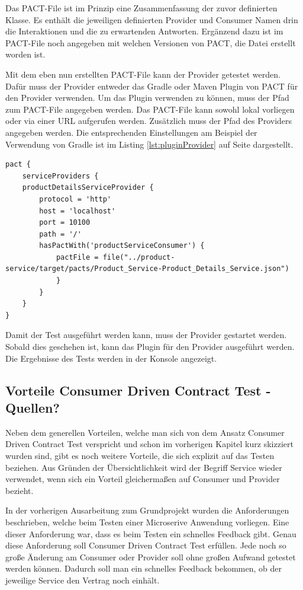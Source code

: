\documentclass{llncs}
\begin{document}
Das PACT-File ist im Prinzip eine Zusammenfassung der zuvor definierten Klasse. Es enthält die jeweiligen definierten Provider und Consumer Namen drin die Interaktionen und die zu erwartenden Antworten. Ergänzend dazu ist im PACT-File noch angegeben mit welchen Versionen von PACT, die Datei erstellt worden ist.

Mit dem eben nun erstellten PACT-File kann der Provider getestet werden. Dafür muss der Provider entweder das Gradle oder Maven Plugin von PACT für den Provider verwenden. Um das Plugin verwenden zu können, muss der Pfad zum PACT-File angegeben werden. Das PACT-File kann sowohl lokal vorliegen oder via einer URL aufgerufen werden. Zusätzlich muss der Pfad des Providers angegeben werden. Die entsprechenden Einstellungen am Beispiel der Verwendung von Gradle ist im Listing \ref{lst:pluginProvider} auf Seite \pageref{lst:pluginProvider} dargestellt.

\lstset{language = Java}
\begin{lstlisting}[caption=Einstellungen für das Testen vom Provider,label=lst:pluginProvider]
pact {
    serviceProviders {
    productDetailsServiceProvider {
        protocol = 'http'
        host = 'localhost'
        port = 10100
        path = '/'
        hasPactWith('productServiceConsumer') {
            pactFile = file("../product-service/target/pacts/Product_Service-Product_Details_Service.json")
			}
		}
	}
}
\end{lstlisting}

Damit der Test ausgeführt werden kann, muss der Provider gestartet werden. Sobald dies geschehen ist, kann das Plugin für den Provider ausgeführt werden. Die Ergebnisse des Tests werden in der Konsole angezeigt.
\subsection{Vorteile Consumer Driven Contract Test - Quellen?}
Neben dem generellen Vorteilen, welche man sich von dem Ansatz Consumer Driven Contract Test verspricht und schon im vorherigen Kapitel kurz skizziert wurden sind, gibt es noch weitere Vorteile, die sich explizit auf das Testen beziehen. Aus Gründen der Übersichtlichkeit wird der Begriff Service wieder verwendet, wenn sich ein Vorteil gleichermaßen auf Consumer und Provider bezieht.

In der vorherigen Ausarbeitung zum Grundprojekt wurden die Anforderungen beschrieben, welche beim Testen einer Microserive Anwendung vorliegen. 
Eine dieser Anforderung war, dass es beim Testen ein schnelles Feedback gibt. 
Genau diese Anforderung soll Consumer Driven Contract Test erfüllen. 
Jede noch so große Änderung am Consumer oder Provider soll ohne großen Aufwand getestet werden können. Dadurch soll man ein schnelles Feedback bekommen, ob der jeweilige Service den Vertrag noch einhält.
\end{document}
